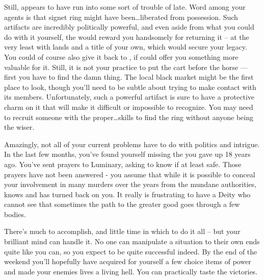 \documentclass[char]{GL2020}
\begin{document}
Still, \cPrince{} appears to have run into some sort of trouble of late. Word among your agents is that \cPrince{\their} signet ring might have been\ldots liberated from \cPrince{\their} possession. Such artifacts are incredibly politically powerful, and even aside from what you could do with it yourself, the \cQueen{\Majesty} would reward you handsomely for returning it -- at the very least with lands and a title of your own, which would secure your legacy. You could of course also give it back to \cPrince{}, if \cPrince{\they} could offer you something more valuable for it. Still, it is not your practice to put the cart before the horse — first you have to find the damn thing. The local black market might be the first place to look, though you'll need to be subtle about trying to make contact with its members. Unfortunately, such a powerful artifact is sure to have a protective charm on it that will make it difficult or impossible to recognize. You may need to recruit someone with the proper\ldots skills to find the ring without anyone being the wiser.

Amazingly, not all of your current problems have to do with politics and intrigue. In the last few months, you've found yourself missing the \cPirateChild{\child} you gave up 18 years ago. You've sent prayers to Luminary, asking to know if \cPirateChild{\theyare} at least safe. Those prayers have not been answered - you assume that while it is possible to conceal your involvement in many murders over the years  from the mundane authorities, \cFarmGod{} knows and has turned \cFarmGod{\their} back on you. It really is frustrating to have a Deity who cannot see that sometimes the path to the greater good goes through a few bodies.

There's much to accomplish, and little time in which to do it all -- but your brilliant mind can handle it. No one can manipulate a situation to their own ends quite like you can, so you expect to be quite successful indeed. By the end of the weekend you'll hopefully have acquired for yourself a few choice items of power and made your enemies lives a living hell.  You can practically taste the victories.
\end{document}
